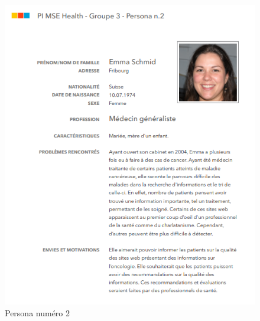 \documentclass{ReportTemplate}
\begin{document}
\begin{figure}[H]
    \centering
    \includegraphics[width=\textwidth]{imageSources/Persona_2.png}
    \caption{Persona numéro 2}
    \label{fig:Persona2}
\end{figure}
\end{document}
